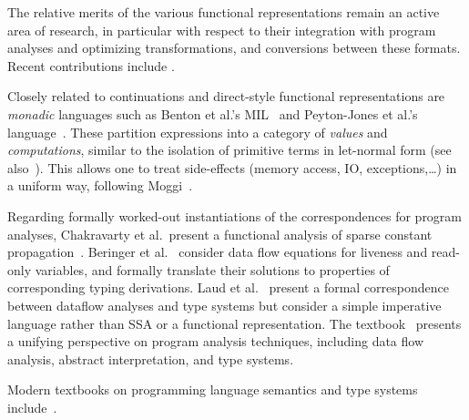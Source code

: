 The relative merits of the various functional representations remain
an active area of research, in particular with respect to their
integration with program analyses and optimizing transformations, and
conversions between these formats. Recent contributions include
\cite{DBLP:journals/jfp/DanvyMN07,DBLP:journals/lisp/Reppy02,DBLP:conf/icfp/Kennedy07}.

Closely related to continuations and direct-style functional
representations are \emph{monadic} languages such as Benton et al.'s
MIL~\cite{BentonKennedyRussel:ICFP1998} and Peyton-Jones et al.'s
language~\cite{PeytonJonesShieldsLT:POPL1998}. These partition
expressions into a category of \emph{values} and \emph{computations},
similar to the isolation of primitive terms in let-normal form (see
also~\cite{Reynolds1974,Plotkin75}). This allows one to treat
side-effects (memory access, IO, exceptions,\ldots) in a uniform way,
following Moggi~\cite{Moggi1991}.

Regarding formally worked-out instantiations of the correspondences
for program analyses, Chakravarty et al.~present a functional analysis
of sparse constant propagation~\cite{ChakravartyKZ:COCV03}. Beringer
et al.~\cite{DBLP:journals/entcs/BeringerMS03} consider data flow
equations for liveness and read-only variables, and formally translate
their solutions to properties of corresponding typing
derivations. Laud et al.~\cite{DBLP:journals/tcs/LaudUV06} present a
formal correspondence between dataflow analyses and type systems but
consider a simple imperative language rather than SSA or a functional
representation. The textbook~\cite{NielsonNielsonHanking:POPA}
presents a unifying perspective on program analysis techniques,
including data flow analysis, abstract interpretation, and type
systems.

Modern textbooks on programming language semantics and type systems
include~\cite{winskel_93_formal,GunterBook,PierceTAPL}.

%
%
